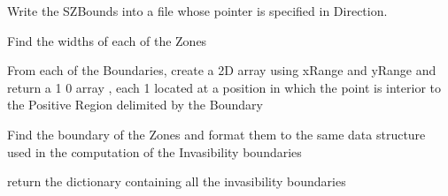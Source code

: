 \documentclass[letterpaper,10pt,english]{sphinxmanual}
\begin{document}
\begin{fulllineitems}
\begin{fulllineitems}
\end{fulllineitems}


\begin{fulllineitems}
\label{Analisis/InvasionAnalysis:InvasionAnalysis.InvBoundaries.WriteZonesBounds}
Write the SZBounds into a file whose pointer is specified in Direction.

\end{fulllineitems}


\begin{fulllineitems}
\label{Analisis/InvasionAnalysis:InvasionAnalysis.InvBoundaries.findWidths}
Find the widths of each of the Zones

\end{fulllineitems}


\begin{fulllineitems}
\label{Analisis/InvasionAnalysis:InvasionAnalysis.InvBoundaries.findZones}
From each of the Boundaries, create a 2D array using xRange and yRange and return a 1 0  array , each 1 located at a position in which
the point is interior to the Positive Region delimited by the Boundary

\end{fulllineitems}


\begin{fulllineitems}
\label{Analisis/InvasionAnalysis:InvasionAnalysis.InvBoundaries.findZonesBoundaries}
Find the boundary of the Zones and format them to the same data structure used in the computation of the Invasibility boundaries

\end{fulllineitems}


\begin{fulllineitems}
\label{Analisis/InvasionAnalysis:InvasionAnalysis.InvBoundaries.getBounds}
return the dictionary containing all the invasibility boundaries


\end{fulllineitems}
\end{fulllineitems}
\end{document}
